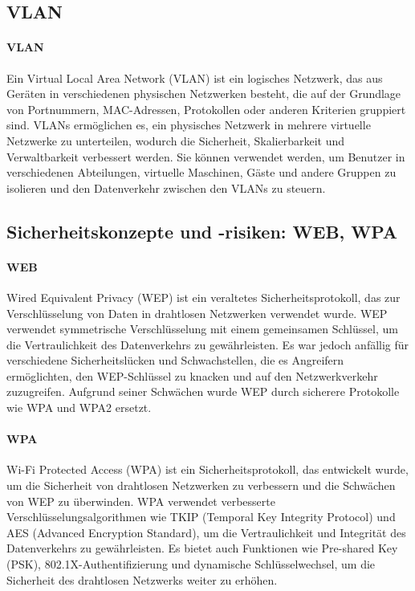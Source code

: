 \subsection{VLAN}

\paragraph{VLAN}

Ein Virtual Local Area Network (VLAN) ist ein logisches Netzwerk, das aus Geräten in verschiedenen physischen Netzwerken besteht, die auf der Grundlage von Portnummern, MAC-Adressen, Protokollen oder anderen Kriterien gruppiert sind. VLANs ermöglichen es, ein physisches Netzwerk in mehrere virtuelle Netzwerke zu unterteilen, wodurch die Sicherheit, Skalierbarkeit und Verwaltbarkeit verbessert werden. Sie können verwendet werden, um Benutzer in verschiedenen Abteilungen, virtuelle Maschinen, Gäste und andere Gruppen zu isolieren und den Datenverkehr zwischen den VLANs zu steuern.

\subsection{Sicherheitskonzepte und -risiken: WEB, WPA}

\paragraph{WEB}

Wired Equivalent Privacy (WEP) ist ein veraltetes Sicherheitsprotokoll, das zur Verschlüsselung von Daten in drahtlosen Netzwerken verwendet wurde. WEP verwendet symmetrische Verschlüsselung mit einem gemeinsamen Schlüssel, um die Vertraulichkeit des Datenverkehrs zu gewährleisten. Es war jedoch anfällig für verschiedene Sicherheitslücken und Schwachstellen, die es Angreifern ermöglichten, den WEP-Schlüssel zu knacken und auf den Netzwerkverkehr zuzugreifen. Aufgrund seiner Schwächen wurde WEP durch sicherere Protokolle wie WPA und WPA2 ersetzt.

\paragraph{WPA}

Wi-Fi Protected Access (WPA) ist ein Sicherheitsprotokoll, das entwickelt wurde, um die Sicherheit von drahtlosen Netzwerken zu verbessern und die Schwächen von WEP zu überwinden. WPA verwendet verbesserte Verschlüsselungsalgorithmen wie TKIP (Temporal Key Integrity Protocol) und AES (Advanced Encryption Standard), um die Vertraulichkeit und Integrität des Datenverkehrs zu gewährleisten. Es bietet auch Funktionen wie Pre-shared Key (PSK), 802.1X-Authentifizierung und dynamische Schlüsselwechsel, um die Sicherheit des drahtlosen Netzwerks weiter zu erhöhen.

